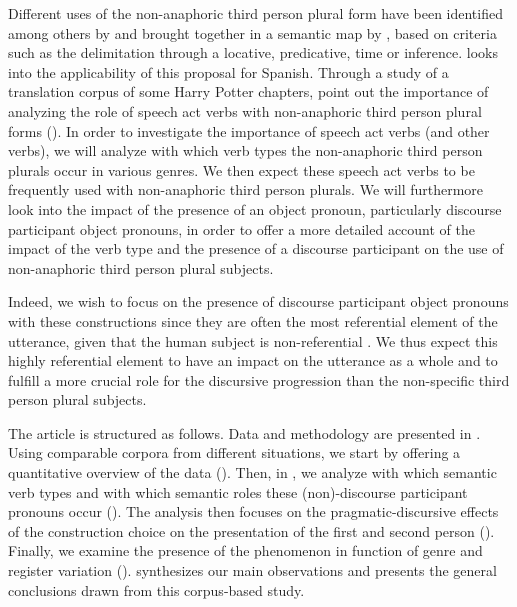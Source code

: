 \documentclass[output=paper]{langscibook}
\begin{document}
Different uses of the non-anaphoric third person plural form have been identified among others by \citet{CabredoHofherr2006} and brought together in a semantic map by \citet{SiewierskaPapastathi2011}, based on criteria such as the delimitation through a locative, predicative, time or inference. \citet{Posio2015Alcance} looks into the applicability of this proposal for Spanish. Through a study of a translation corpus of some Harry Potter chapters, \citet{SiewierskaPapastathi2011} point out the importance of analyzing the role of speech act verbs with non-anaphoric third person plural forms (\citeyear[606]{SiewierskaPapastathi2011}). In order to investigate the importance of speech act verbs (and other verbs), we will analyze with which verb types the non-anaphoric third person plurals occur in various genres. We then expect these speech act verbs to be frequently used with non-anaphoric third person plurals. We will furthermore look into the impact of the presence of an object pronoun, particularly discourse participant object pronouns, in order to offer a more detailed account of the impact of the verb type and the presence of a discourse participant on the use of non-anaphoric third person plural subjects. 


Indeed, we wish to focus on the presence of discourse participant object pronouns with these constructions since they are often the most referential element of the utterance, given that the human subject is non-referential \citep[577]{SiewierskaPapastathi2011}. We thus expect this highly referential element to have an impact on the utterance as a whole and to fulfill a more crucial role for the discursive progression than the non-specific third person plural subjects.


The article is structured as follows. Data and methodology are presented in .  Using comparable corpora from different situations, we start by offering a quantitative overview of the data (). Then, in , we analyze with which semantic verb types and with which semantic roles these (non)-discourse participant pronouns occur (). The analysis then focuses on the pragmatic-discursive effects of the construction choice on the presentation of the first and second person (). Finally, we examine the presence of the phenomenon in function of genre and register variation ().  synthesizes our main observations and presents the general conclusions drawn from this corpus-based study.
\end{document}
